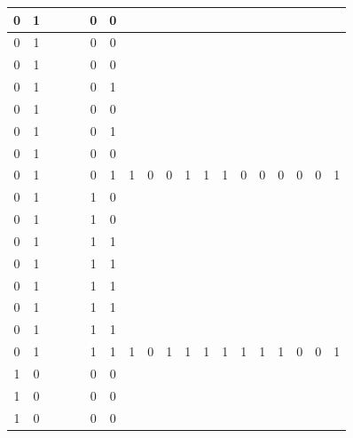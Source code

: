 \begin{table}[!tb]
\begin{tabular}{|c|c|c|c|c|c|c|c|c|c|c|c|c|c|c|c|c|c|c|}
        \rowcolor{red!40} 0 & 1 &  &  &  & 0 & 0 &  &  &  &  &  &  &  &  &  &  &  &  \\ \hline
        \rowcolor{red!40} 0 & 1 &  &  &  & 0 & 0 &  &  &  &  &  &  &  &  &  &  &  &  \\ \hline
        \rowcolor{red!40} 0 & 1 &  &  &  & 0 & 0 &  &  &  &  &  &  &  &  &  &  &  &  \\ \hline
        \rowcolor{red!40} 0 & 1 &  &  &  & 0 & 1 &  &  &  &  &  &  &  &  &  &  &  &  \\ \hline
        \rowcolor{red!40} 0 & 1 &  &  &  & 0 & 0 &  &  &  &  &  &  &  &  &  &  &  &  \\ \hline
        \rowcolor{red!40} 0 & 1 &  &  &  & 0 & 1 &  &  &  &  &  &  &  &  &  &  &  &  \\ \hline
        \rowcolor{red!40} 0 & 1 &  &  &  & 0 & 0 &  &  &  &  &  &  &  &  &  &  &  &  \\ \hline
        \rowcolor{red!40} 0 & 1 &  &  &  & 0 & 1 & 1 & 0 & 0 & 1 & 1 & 1 & 0 & 0 & 0 & 0 & 0 & 1 \\ \hline
        \rowcolor{green!40} 0 & 1 &  &  &  & 1 & 0 &  &  &  &  &  &  &  &  &  &  &  &  \\ \hline
        \rowcolor{green!40} 0 & 1 &  &  &  & 1 & 0 &  &  &  &  &  &  &  &  &  &  &  &  \\ \hline
        \rowcolor{green!40} 0 & 1 &  &  &  & 1 & 1 &  &  &  &  &  &  &  &  &  &  &  &  \\ \hline
        \rowcolor{green!40} 0 & 1 &  &  &  & 1 & 1 &  &  &  &  &  &  &  &  &  &  &  &  \\ \hline
        \rowcolor{green!40} 0 & 1 &  &  &  & 1 & 1 &  &  &  &  &  &  &  &  &  &  &  &  \\ \hline
        \rowcolor{green!40} 0 & 1 &  &  &  & 1 & 1 &  &  &  &  &  &  &  &  &  &  &  &  \\ \hline
        \rowcolor{green!40} 0 & 1 &  &  &  & 1 & 1 &  &  &  &  &  &  &  &  &  &  &  &  \\ \hline
        \rowcolor{green!40} 0 & 1 &  &  &  & 1 & 1 & 1 & 0 & 1 & 1 & 1 & 1 & 1 & 1 & 1 & 0 & 0 & 1 \\ \hline
        \rowcolor{yellow!40} 1 & 0 &  &  &  & 0 & 0 &  &  &  &  &  &  &  &  &  &  &  &  \\ \hline
        \rowcolor{yellow!40} 1 & 0 &  &  &  & 0 & 0 &  &  &  &  &  &  &  &  &  &  &  &  \\ \hline
        \rowcolor{yellow!40} 1 & 0 &  &  &  & 0 & 0 &  &  &  &  &  &  &  &  &  &  &  &  \\ \hline

\end{tabular}
\end{table}

